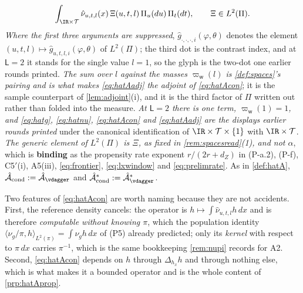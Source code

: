 \begin{definition}
\begin{equation}
\int_{\IR\times\mathcal T}\hat\nu_{u,t,l}(x)\,
\Xi(u,t,l)\,\Pi_u(du)\,\Pi_t(dt),
\qquad \Xi\in L^{2}(\Pi) .
\end{equation}
\emph{Where the first three arguments are suppressed}, $\hat g_{\cdot,\cdot,\cdot,i}(\varphi,\theta)$
denotes the element $(u,t,l)\mapsto\hat g_{u,t,l,i}(\varphi,\theta)$ of $L^{2}(\Pi)$; the third dot
is the contrast index, and at $\mathsf L=2$ it stands for the single value $l=1$, so the glyph is the
two-dot one earlier rounds printed.
\emph{The sum over $l$ against the masses $\varpi_{\mathsf w}(l)$ is \cref{def:spaces}'s pairing and is
what makes \eqref{eq:hatAadj} the adjoint of \eqref{eq:hatAcon}}; it is the sample counterpart of
\cref{lem:adjoint}\textup{(i)}, and it is the third factor of $\Pi$ written out rather than folded into
the measure. \emph{At $\mathsf L=2$ there is one term, $\varpi_{\mathsf w}(1)=1$, and \eqref{eq:hatg},
\eqref{eq:hatnu}, \eqref{eq:hatAcon} and \eqref{eq:hatAadj} are the displays earlier rounds printed}
under the canonical identification of $\IR\times\mathcal T\times\{1\}$ with $\IR\times\mathcal T$.
\emph{The generic element of $L^{2}(\Pi)$ is $\Xi$, as fixed in \cref{rem:spacesread}\textup{(1)}, and not $\alpha$},
which is \textbf{binding} as the propensity rate exponent $r/(2r+d_Z)$ in (P-a.2), (P-f), C5$'$(i),
A5(iii), \eqref{eq:frontier}, \eqref{eq:lxwindow} and \eqref{eq:prelimrate}.
As in \cref{def:hatA}, $\hat{\mathcal A}_{\mathrm{cond}}:=\hat{\mathcal A}_{\vdagger}$ and
$\hat{\mathcal A}^\ast_{\mathrm{cond}}:=\hat{\mathcal A}^\ast_{\vdagger}$.

Two features of \eqref{eq:hatAcon} are worth naming because they are not accidents. First, the
reference density cancels: the operator is $h\mapsto\int\hat\nu_{u,t,l}h\,dx$ and is therefore
\emph{computable without knowing $\pi$}, which the population identity
$\langle\nu_g/\pi,h\rangle_{L^{2}(\pi)}=\int\nu_gh\,dx$ of (P5) already predicted; only its
\emph{kernel} with respect to $\pi\,dx$ carries $\pi^{-1}$, which is the same bookkeeping
\cref{rem:nupi} records for A2. Second, \eqref{eq:hatAcon} depends on $h$ through
$\Delta_{h_x}h$ and through nothing else, which is what makes it a bounded operator and is the whole
content of \cref{prp:hatAprop}.
\end{definition}

